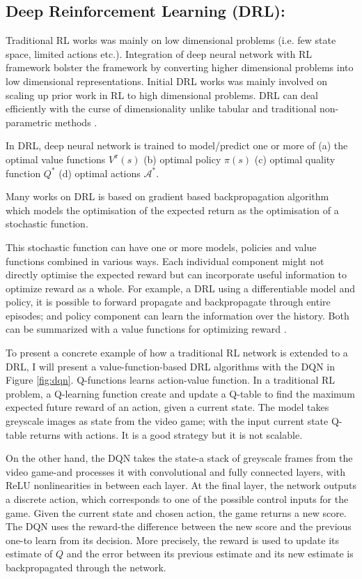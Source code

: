 \subsection{Deep Reinforcement Learning (DRL):}
Traditional RL works was mainly on low dimensional problems (i.e. few state space, limited actions etc.). Integration of deep neural network with RL framework bolster the framework by converting higher dimensional problems into low dimensional representations. Initial DRL works was mainly involved on scaling up prior work in RL to high dimensional problems.
DRL can deal
efficiently with the curse of dimensionality unlike tabular and
traditional non-parametric methods \cite{bengio2013representation}.

In DRL, deep neural network is trained to model/predict one or more of (a) the optimal value functions $V^\pi(s)$ (b) optimal policy $\pi(s)$
(c) optimal quality function $Q^*$ (d) optimal actions $\mathcal{A}^*$.

Many works on DRL is based on gradient based backpropagation algorithm \cite{heess2015learning, schulman2015gradient, rumelhart1985learning} which models the optimisation
of the expected return as the optimisation of a
stochastic function.

This stochastic function can have one or more
models, policies and value functions combined in various ways.
Each individual component might not directly optimise the expected reward but can incorporate useful information to optimize reward as a whole.
For example, a DRL using a differentiable model and policy,
it is possible to forward propagate and backpropagate through
entire episodes; and policy component can learn the information over the history. Both can be summarized with a value functions for optimizing reward \cite{heess2015learning}.

To present a concrete example of how a traditional RL network is extended to a DRL, I will present a value-function-based DRL algorithms
with the DQN in Figure \ref{fig:dqn}.
Q-functions learns action-value function. In a traditional RL problem, a Q-learning function create and update a Q-table to find the maximum expected future reward of an action, given a current state. The model takes greyscale images as state from the video game; with the input current state Q-table returns with actions. It is a good strategy but it is not scalable.

On the other hand, the DQN takes the state-a stack of greyscale frames from the video game-and processes it with convolutional and
fully connected layers, with ReLU nonlinearities in between each layer. At the final layer, the network outputs a discrete action, which corresponds to one of the possible control inputs for the game.  Given the current state and chosen action, the game returns a new score.
The DQN uses the reward-the difference
between the new score and the previous one-to learn from its decision. More precisely, the reward is used to update its estimate of $Q$ and the error between its previous estimate and its new estimate is backpropagated through the network.

